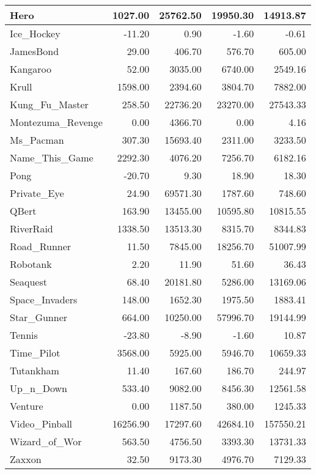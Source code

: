 \documentclass{article}
\begin{document}
\begin{table*}[h]
\begin{tabular}{l|r|r|r|r}
		\hline
		Hero & 1027.00 & 25762.50 & 19950.30 & 14913.87 \\
		\hline
		Ice\_Hockey & -11.20 & 0.90 & -1.60 & -0.61 \\
		\hline
		JamesBond & 29.00 & 406.70 & 576.70 & 605.00 \\
		\hline
		Kangaroo & 52.00 & 3035.00 & 6740.00 & 2549.16 \\
		\hline
		Krull & 1598.00 & 2394.60 & 3804.70 & 7882.00 \\
		\hline
		Kung\_Fu\_Master & 258.50 & 22736.20 & 23270.00 & 27543.33 \\
		\hline
		Montezuma\_Revenge & 0.00 & 4366.70 & 0.00 & 4.16 \\
		\hline
		Ms\_Pacman & 307.30 & 15693.40 & 2311.00 & 3233.50 \\
		\hline
		Name\_This\_Game & 2292.30 & 4076.20 & 7256.70 & 6182.16 \\
		\hline
		Pong & -20.70 & 9.30 & 18.90 & 18.30 \\
		\hline
		Private\_Eye & 24.90 & 69571.30 & 1787.60 & 748.60 \\
		\hline
		QBert & 163.90 & 13455.00 & 10595.80 & 10815.55 \\
		\hline
		RiverRaid & 1338.50 & 13513.30 & 8315.70 & 8344.83 \\
		\hline
		Road\_Runner & 11.50 & 7845.00 & 18256.70 & 51007.99 \\
		\hline
		Robotank & 2.20 & 11.90 & 51.60 & 36.43 \\
		\hline
		Seaquest & 68.40 & 20181.80 & 5286.00 & 13169.06 \\
		\hline
		Space\_Invaders & 148.00 & 1652.30 & 1975.50 & 1883.41 \\
		\hline
		Star\_Gunner & 664.00 & 10250.00 & 57996.70 & 19144.99 \\
		\hline
		Tennis & -23.80 & -8.90 & -1.60 & 10.87 \\
		\hline
		Time\_Pilot & 3568.00 & 5925.00 & 5946.70 & 10659.33 \\
		\hline
		Tutankham & 11.40 & 167.60 & 186.70 & 244.97 \\
		\hline
		Up\_n\_Down & 533.40 & 9082.00 & 8456.30 & 12561.58 \\
		\hline
		Venture & 0.00 & 1187.50 & 380.00 & 1245.33 \\
		\hline
		Video\_Pinball & 16256.90 & 17297.60 & 42684.10 & 157550.21 \\
		\hline
		Wizard\_of\_Wor & 563.50 & 4756.50 & 3393.30 & 13731.33 \\
		\hline
		Zaxxon & 32.50 & 9173.30 & 4976.70 & 7129.33 \\
		\hline
	\end{tabular}
\end{table*}

 
\end{document}
